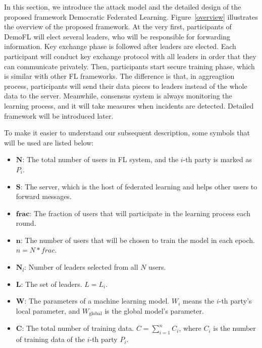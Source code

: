 In this section, we introduce the attack model and the detailed design of the proposed framework Democratic Federated Learning. Figure~\ref{overview} illustrates the overview of the proposed framework. At the very first, participants of DemoFL will elect several leaders, who will be responsible for forwarding information. Key exchange phase is followed after leaders are elected. Each participant will conduct key exchange protocol with all leaders in order that they can communicate privately. Then, participants start secure training phase, which is similar with other FL frameworks. The difference is that, in aggreagtion process, participants will send their data pieces to leaders instead of the whole data to the server. Meanwhile, consensus system is always monitoring the learning process, and it will take measures when incidents are detected. Detailed framework will be introduced later.

To make it easier to understand our subsequent description, some symbols that will be used are listed below:

\begin{itemize}
    \item $\textbf{N}$: The total number of users in FL system, and the $i$-th party is marked as $P_i$.
    \item $\textbf{S}$: The server, which is the host of federated learning and helps other users to forward messages.
    \item $\textbf{frac}$: The fraction of users that will participate in the learning process each round.
    \item $\textbf{n}$: The number of users that will be chosen to train the model in each epoch. $n = N * frac$.
    \item $\textbf{N}_l$: Number of leaders selected from all $N$ users.
    \item $\textbf{L}$: The set of leaders. $L = {L_i}$.
    \item $\textbf{W}$: The parameters of a machine learning model. $W_i$ means the $i$-th party's local parameter, and $W_\textrm{global}$ is the global model's parameter.
    \item $\textbf{C}$: The total number of training data. $C = \sum_{i=1}^nC_i$, where $C_i$ is the number of training data of the $i$-th party $P_i$.
\end{itemize}

